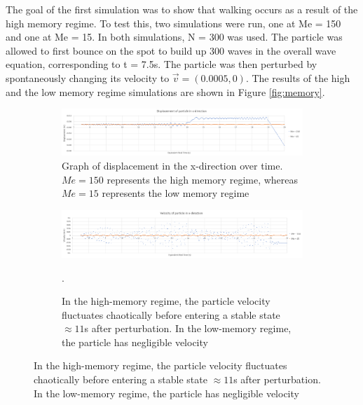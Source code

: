 The goal of the first simulation was to show that walking occurs as a result of the high memory regime. To test this, two simulations were run, one at Me = 150 and one at Me = 15. In both simulations, N = 300 was used. The particle was allowed to first bounce on the spot to build up 300 waves in the overall wave equation, corresponding to t = 7.5s. The particle was then perturbed by spontaneously changing its velocity to $\vec{v} = (0.0005,0)$. The results of the high and the low memory regime simulations are shown in Figure \ref{fig:memory}.

\begin{figure}
	\centering
	\begin{subfigure}{\textwidth}
		\includegraphics[width=\textwidth]{simulation/highmemory/displacement.png}
		\caption{Graph of displacement in the x-direction over time. $Me=150$ represents the high memory regime, whereas $Me=15$ represents the low memory regime}
		\label{fig:mem:displacement}
	\end{subfigure}
	
	\begin{subfigure}{\textwidth}
		\includegraphics[width=\textwidth]{simulation/highmemory/velocity.png}
		\caption{In the high-memory regime, the particle velocity fluctuates chaotically before entering a stable state $\approx 11$s after perturbation. In the low-memory regime, the particle has negligible velocity}
		\label{fig:mem:velocity}.
	\end{subfigure}
	

\end{figure}
